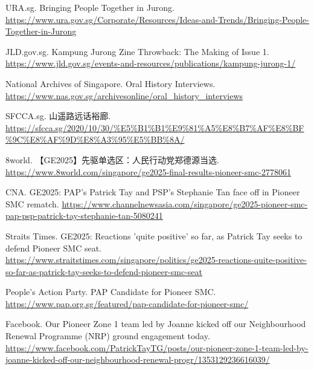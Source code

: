 \documentclass[11pt,a4paper,twoside,openany]{book}
\begin{document}
\begin{enumerate}[label={[\arabic*]},leftmargin=*,topsep=2pt,itemsep=1pt,parsep=0pt]
  \item URA.sg. Bringing People Together in Jurong. \url{https://www.ura.gov.sg/Corporate/Resources/Ideas-and-Trends/Bringing-People-Together-in-Jurong}
  \item JLD.gov.sg. Kampung Jurong Zine Throwback: The Making of Issue 1. \url{https://www.jld.gov.sg/events-and-resources/publications/kampung-jurong-1/}
  \item National Archives of Singapore. Oral History Interviews. \url{https://www.nas.gov.sg/archivesonline/oral_history_interviews}
  \item SFCCA.sg. 山遥路远话裕廊. \url{https://sfcca.sg/2020/10/30/%E5%B1%B1%E9%81%A5%E8%B7%AF%E8%BF%9C%E8%AF%9D%E8%A3%95%E5%BB%8A/}
  \item 8world. 【GE2025】先驱单选区：人民行动党郑德源当选. \url{https://www.8world.com/singapore/ge2025-final-results-pioneer-smc-2778061}
  \item CNA. GE2025: PAP's Patrick Tay and PSP's Stephanie Tan face off in Pioneer SMC rematch. \url{https://www.channelnewsasia.com/singapore/ge2025-pioneer-smc-pap-psp-patrick-tay-stephanie-tan-5080241}
  \item Straits Times. GE2025: Reactions 'quite positive' so far, as Patrick Tay seeks to defend Pioneer SMC seat. \url{https://www.straitstimes.com/singapore/politics/ge2025-reactions-quite-positive-so-far-as-patrick-tay-seeks-to-defend-pioneer-smc-seat}
  \item People's Action Party. PAP Candidate for Pioneer SMC. \url{https://www.pap.org.sg/featured/pap-candidate-for-pioneer-smc/}
  \item Facebook. Our Pioneer Zone 1 team led by Joanne kicked off our Neighbourhood Renewal Programme (NRP) ground engagement today. \url{https://www.facebook.com/PatrickTayTG/posts/our-pioneer-zone-1-team-led-by-joanne-kicked-off-our-neighbourhood-renewal-progr/1353129236616039/}
\end{enumerate}


\backmatter

\end{document}
